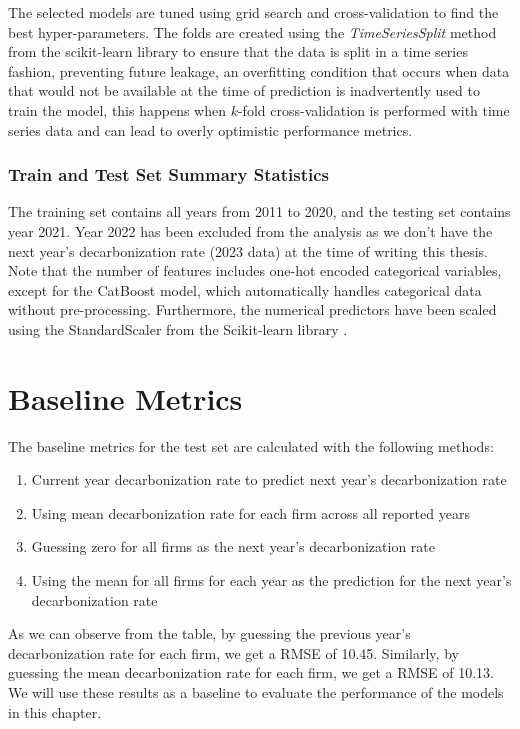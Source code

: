 The selected models are tuned using grid search and cross-validation to find the best hyper-parameters. The folds are created using the \textit{TimeSeriesSplit} method from the scikit-learn library \cite{scikit-learn} to ensure that the data is split in a time series fashion, preventing future leakage, an overfitting condition that occurs when data that would not be available at the time of prediction is inadvertently used to train the model, this happens when $k$-fold cross-validation is performed with time series data and can lead to overly optimistic performance metrics.

\subsubsection{Train and Test Set Summary Statistics}
The training set contains all years from 2011 to 2020, and the testing set contains year 2021. Year 2022 has been excluded from the analysis as we don't have the next year's decarbonization rate (2023 data) at the time of writing this thesis. Note that the number of features includes one-hot encoded categorical variables, except for the CatBoost model, which automatically handles categorical data without pre-processing. Furthermore, the numerical predictors have been scaled using the StandardScaler from the Scikit-learn library \cite{scikit-learn}.



\section{Baseline Metrics}
The baseline metrics for the test set are calculated with the following methods:
\begin{enumerate}
    \item Current year decarbonization rate to predict next year's decarbonization rate
    \item Using mean decarbonization rate for each firm across all reported years
    \item Guessing zero for all firms as the next year's decarbonization rate
    \item Using the mean for all firms for each year as the prediction for the next year's decarbonization rate
\end{enumerate}



\noindent As we can observe from the table, by guessing the previous year's decarbonization rate for each firm, we get a RMSE of 10.45. Similarly, by guessing the mean decarbonization rate for each firm, we get a RMSE of 10.13. We will use these results as a baseline to evaluate the performance of the models in this chapter.

